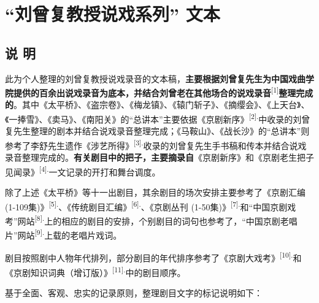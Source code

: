 \hypertarget{section}{%
\section{}\label{section}}

\hypertarget{section-1}{%
\section{}\label{section-1}}

\hypertarget{ux5218ux66feux590dux6559ux6388ux8bf4ux620fux7cfbux5217-ux6587ux672c}{%
\section{``刘曾复教授说戏系列''
文本}\label{ux5218ux66feux590dux6559ux6388ux8bf4ux620fux7cfbux5217-ux6587ux672c}}

\hypertarget{ux8bf4-ux660e}{%
\subsection{说 明}\label{ux8bf4-ux660e}}

此为个人整理的刘曾复教授说戏录音的文本稿，\textbf{主要根据刘曾复先生为中国戏曲学院提供的百余出说戏录音为底本，并结合刘曾老在其他场合的说戏录音}\textsuperscript{{[}1{]}}\textbf{整理完成的}。其中《太平桥》、《盗宗卷》、《梅龙镇》、《辕门斩子》、《摘缨会》、《上天台》、《一捧雪》、《卖马》、《南阳关》的``总讲本''主要依据《京剧新序》\textsuperscript{{[}2{]}.}中收录的刘曾复先生整理的剧本并结合说戏录音整理完成；《马鞍山》、《战长沙》的``总讲本''则参考了李舒先生遗作《涉艺所得》\textsuperscript{{[}3{]}.}收录的刘曾复先生手书稿和传本并结合说戏录音整理完成的。\textbf{有关剧目中的把子，主要摘录自}《京剧新序》和《京剧老生把子见闻录》\textsuperscript{{[}4{]}.}一文记录的开打和舞台调度。

除了上述《太平桥》等十一出剧目，其余剧目的场次安排主要参考了《京剧汇编
(1-109集)》\textsuperscript{{[}5{]}.}、《传统剧目汇编》\textsuperscript{{[}6{]}.}、《京剧丛刊
(1-50集)》\textsuperscript{{[}7{]}.}和``中国京剧戏考''网站\textsuperscript{{[}8{]}.}上的相应的剧目的安排，个别剧目的词句也参考了，``中国京剧老唱片''网站\textsuperscript{{[}9{]}.}上载的老唱片戏词。

剧目按照剧中人物年代排列，部分剧目的年代排序参考了《京剧大戏考》\textsuperscript{{[}10{]}.}和《京剧知识词典（增订版）》\textsuperscript{{[}11{]}.}中的剧目顺序。

基于全面、客观、忠实的记录原则，整理剧目文字的标记说明如下：

